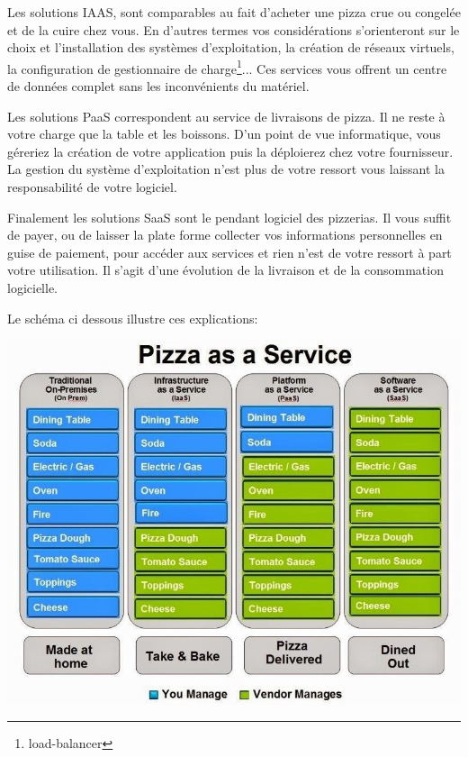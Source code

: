 \documentclass[11pt, a4paper ]{article}
\begin{document}
\begin{spacing}{1.5}
Les solutions IAAS, sont comparables au fait d'acheter une pizza crue ou congelée et de la cuire chez vous. En d'autres termes vos considérations s'orienteront sur le choix et l'installation des systèmes d'exploitation, la création de réseaux virtuels, la configuration de gestionnaire de charge\footnote{load-balancer}... Ces services vous offrent un centre de données complet sans les inconvénients du matériel.

Les solutions PaaS correspondent au service de livraisons de pizza. Il ne reste à votre charge que la table et les boissons. D'un point de vue informatique, vous géreriez la création de votre application puis la déploierez chez votre fournisseur. La gestion du système d'exploitation n'est plus de votre ressort vous laissant la responsabilité de votre logiciel.

Finalement les solutions SaaS sont le pendant logiciel des pizzerias. Il vous suffit de payer, ou de laisser la plate forme collecter vos informations personnelles en guise de paiement, pour accéder aux services et rien n'est de votre ressort à part votre utilisation. Il s'agit d'une évolution de la livraison et de la consommation logicielle.

Le schéma ci dessous illustre ces explications:

\includegraphics[width=\textwidth]{images/PizzaasaService.jpg}



\end{spacing}
\end{document}
